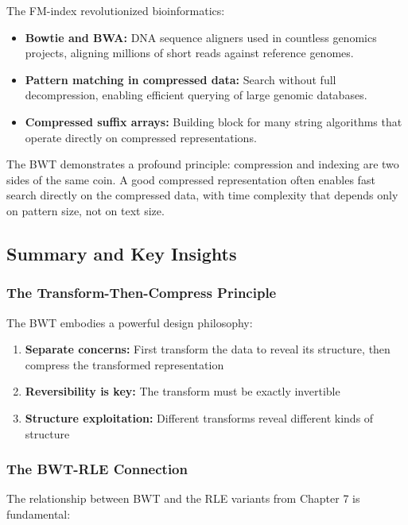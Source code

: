 The FM-index revolutionized bioinformatics:
\begin{itemize}
    \item \textbf{Bowtie and BWA:} DNA sequence aligners used in countless genomics projects, aligning millions of short reads against reference genomes.
    \item \textbf{Pattern matching in compressed data:} Search without full decompression, enabling efficient querying of large genomic databases.
    \item \textbf{Compressed suffix arrays:} Building block for many string algorithms that operate directly on compressed representations.
\end{itemize}

\begin{importantbox}
The BWT demonstrates a profound principle: compression and indexing are two sides of the same coin. A good compressed representation often enables fast search directly on the compressed data, with time complexity that depends only on pattern size, not on text size.
\end{importantbox}

\subsection{Summary and Key Insights}

\subsubsection{The Transform-Then-Compress Principle}

The BWT embodies a powerful design philosophy:

\begin{enumerate}
    \item \textbf{Separate concerns:} First transform the data to reveal its structure, then compress the transformed representation
    \item \textbf{Reversibility is key:} The transform must be exactly invertible
    \item \textbf{Structure exploitation:} Different transforms reveal different kinds of structure
\end{enumerate}

\subsubsection{The BWT-RLE Connection}

The relationship between BWT and the RLE variants from Chapter 7 is fundamental:

